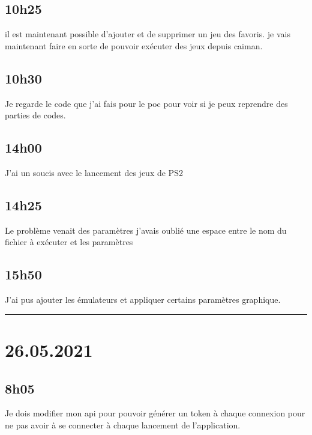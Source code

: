 \documentclass[a4paper,12pt,french]{sphinxmanual}
\begin{document}
\subsection{10h25}
\label{\detokenize{logbook:h25}}
\sphinxAtStartPar
il est maintenant possible d’ajouter et de supprimer un jeu des favoris.
je vais maintenant faire en sorte de pouvoir exécuter des jeux depuis caiman.


\subsection{10h30}
\label{\detokenize{logbook:id151}}
\sphinxAtStartPar
Je regarde le code que j’ai fais pour le poc pour voir si je peux reprendre des parties de codes.


\subsection{14h00}
\label{\detokenize{logbook:id152}}
\sphinxAtStartPar
J’ai un soucis avec le lancement des jeux de PS2


\subsection{14h25}
\label{\detokenize{logbook:id153}}
\sphinxAtStartPar
Le problème venait des paramètres j’avais oublié une espace entre le nom du fichier à exécuter et les paramètres


\subsection{15h50}
\label{\detokenize{logbook:id154}}
\sphinxAtStartPar
J’ai pus ajouter les émulateurs et appliquer certains paramètres graphique.


\bigskip\hrule\bigskip



\section{26.05.2021}
\label{\detokenize{logbook:id155}}

\subsection{8h05}
\label{\detokenize{logbook:id156}}
\sphinxAtStartPar
Je dois modifier mon api pour pouvoir générer un token à chaque connexion pour ne pas avoir à se connecter à chaque lancement de l’application.
\end{document}
